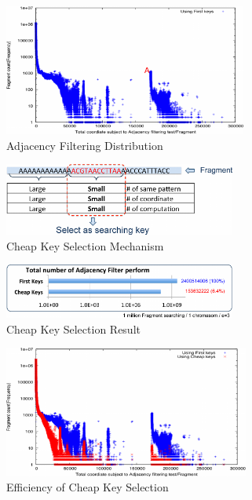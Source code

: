 \begin{figure}[b] \centering \vspace{0.1in}
\includegraphics[height=1.7in]{./figure/Key_Dist_B.pdf} \vspace{0in}
\caption{Adjacency Filtering Distribution} 
\label{fig:key_dist} 
\end{figure}
\begin{figure}[t] \centering \vspace{0.1in}
\includegraphics[width=3.0in]{./figure/Cheap_Key_B.pdf} \vspace{0in}
\caption{Cheap Key Selection Mechanism} 
\label{fig:cheap_key} 
\end{figure}
\begin{figure}[h] \centering \vspace{0.1in}
\includegraphics[width=3.0in]{./figure/CK_Result_B.pdf} \vspace{0in}
\caption{Cheap Key Selection Result} 
\label{fig:ck_result} 
\end{figure}
\begin{figure}[b] \centering \vspace{0.1in}
\includegraphics[height=1.7in]{./figure/Key_Dist2_B.pdf} \vspace{0in}
\caption{Efficiency of Cheap Key Selection} 
\label{fig:key_dist2} 
\end{figure}
